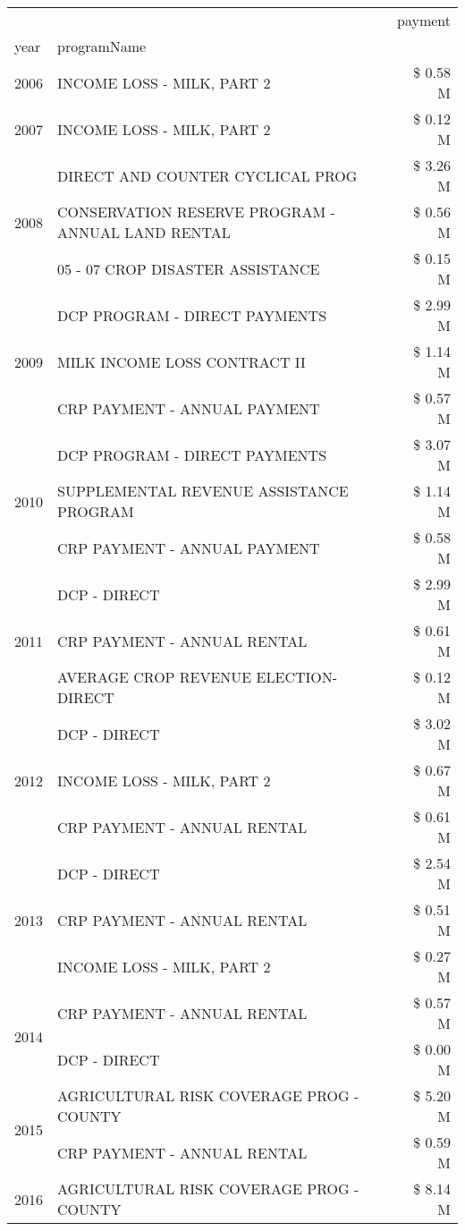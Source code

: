 \begin{tabular}{llr}
\toprule
 &  & payment \\
year & programName &  \\
\midrule
2006 & INCOME LOSS - MILK, PART 2 & \$ 0.58 M \\
\cline{1-3}
2007 & INCOME LOSS - MILK, PART 2 & \$ 0.12 M \\
\cline{1-3}
\multirow[t]{3}{*}{2008} & DIRECT AND COUNTER CYCLICAL PROG & \$ 3.26 M \\
 & CONSERVATION RESERVE PROGRAM - ANNUAL LAND RENTAL & \$ 0.56 M \\
 & 05 - 07 CROP DISASTER ASSISTANCE & \$ 0.15 M \\
\cline{1-3}
\multirow[t]{3}{*}{2009} & DCP PROGRAM - DIRECT PAYMENTS & \$ 2.99 M \\
 & MILK INCOME LOSS CONTRACT II & \$ 1.14 M \\
 & CRP PAYMENT - ANNUAL PAYMENT & \$ 0.57 M \\
\cline{1-3}
\multirow[t]{3}{*}{2010} & DCP PROGRAM - DIRECT PAYMENTS & \$ 3.07 M \\
 & SUPPLEMENTAL REVENUE ASSISTANCE PROGRAM & \$ 1.14 M \\
 & CRP PAYMENT - ANNUAL PAYMENT & \$ 0.58 M \\
\cline{1-3}
\multirow[t]{3}{*}{2011} & DCP - DIRECT & \$ 2.99 M \\
 & CRP PAYMENT - ANNUAL RENTAL & \$ 0.61 M \\
 & AVERAGE CROP REVENUE ELECTION-DIRECT & \$ 0.12 M \\
\cline{1-3}
\multirow[t]{3}{*}{2012} & DCP - DIRECT & \$ 3.02 M \\
 & INCOME LOSS - MILK, PART 2 & \$ 0.67 M \\
 & CRP PAYMENT - ANNUAL RENTAL & \$ 0.61 M \\
\cline{1-3}
\multirow[t]{3}{*}{2013} & DCP - DIRECT & \$ 2.54 M \\
 & CRP PAYMENT - ANNUAL RENTAL & \$ 0.51 M \\
 & INCOME LOSS - MILK, PART 2 & \$ 0.27 M \\
\cline{1-3}
\multirow[t]{2}{*}{2014} & CRP PAYMENT - ANNUAL RENTAL & \$ 0.57 M \\
 & DCP - DIRECT & \$ 0.00 M \\
\cline{1-3}
\multirow[t]{2}{*}{2015} & AGRICULTURAL RISK COVERAGE PROG - COUNTY & \$ 5.20 M \\
 & CRP PAYMENT - ANNUAL RENTAL & \$ 0.59 M \\
\cline{1-3}
\multirow[t]{3}{*}{2016} & AGRICULTURAL RISK COVERAGE PROG - COUNTY & \$ 8.14 M \\

\end{tabular}
